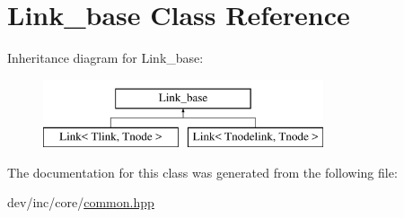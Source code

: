 \hypertarget{classLink__base}{}\section{Link\+\_\+base Class Reference}
\label{classLink__base}
Inheritance diagram for Link\+\_\+base\+:\begin{figure}[H]
\begin{center}
\leavevmode
\includegraphics[height=2.000000cm]{classLink__base}
\end{center}
\end{figure}


The documentation for this class was generated from the following file\+:\begin{DoxyCompactItemize}
\item 
dev/inc/core/\hyperlink{common_8hpp}{common.\+hpp}\end{DoxyCompactItemize}
